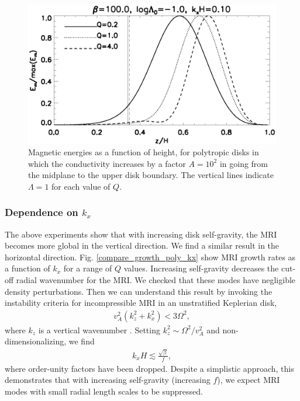 \begin{figure}
  \includegraphics[width=\linewidth]{figures/compare_results_poly_layer_amp100}
  \caption{Magnetic energies as a function of height, for polytropic disks
    in which the conductivity increases by a
    factor $A=10^2$ in going from the midplane to the upper disk
    boundary. The vertical lines indicate $\Lambda=1$ for each value 
    of $Q$.
    \label{poly_layer}}
\end{figure}

\subsubsection{Dependence on $k_x$}
The above experiments show that with increasing 
disk self-gravity, the MRI becomes more global in the vertical
direction. We find a similar result in the horizontal direction. 
Fig. \ref{compare_growth_poly_kx} show MRI growth rates as a
function of $k_x$ for a range of $Q$ values. Increasing self-gravity
decreases the cut-off radial wavenumber for the MRI. We checked
that these modes have negligible density perturbations. Then we can 
understand this result by invoking the instability criteria for  
incompressible MRI in an unstratified Keplerian disk,
\begin{align}
  v_A^2(k_z^2 + k_x^2) < 3\Omega^2,
\end{align}
where $k_z$ is a vertical wavenumber \citep{kim00}. Setting $k_z^2\sim
\Omega^2/v_A^2$ and non-dimensionalizing, we find
\begin{align} 
  k_xH \lesssim \frac{\sqrt{\beta}}{f},
\end{align}
where order-unity factors have been dropped. Despite a simplistic
approach, this demonstrates that with increasing self-gravity
(increasing $f$), we expect MRI modes with small radial
length scales to be suppressed.   


